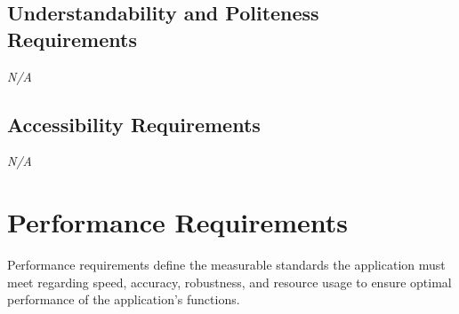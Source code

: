 \documentclass[12pt]{article}
\begin{document}
\subsection{Understandability and Politeness Requirements}
\emph{N/A}

\subsection{Accessibility Requirements}
\emph{N/A}

\section{Performance Requirements}
Performance requirements define the measurable standards the application must meet regarding speed, accuracy, robustness, and resource usage to ensure optimal performance of the application's functions.
\end{document}
